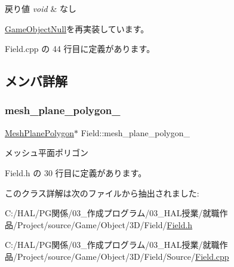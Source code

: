 \begin{DoxyRetVals}{戻り値}
{\em void} & なし \\
\hline
\end{DoxyRetVals}


\mbox{\hyperlink{class_game_object_null_a1a70fbd3260fd1c0100320756830a0db}{Game\+Object\+Null}}を再実装しています。



 Field.\+cpp の 44 行目に定義があります。



\subsection{メンバ詳解}
\mbox{\label{class_field_a5c4ad4d2fea2269e7ab2185cf09beb10}} 
\subsubsection{\texorpdfstring{mesh\+\_\+plane\+\_\+polygon\+\_\+}{mesh\_plane\_polygon\_}}
{\footnotesize\ttfamily \mbox{\hyperlink{class_mesh_plane_polygon}{Mesh\+Plane\+Polygon}}$\ast$ Field\+::mesh\+\_\+plane\+\_\+polygon\+\_\+\hspace{0.3cm}{\ttfamily [private]}}



メッシュ平面ポリゴン 



 Field.\+h の 30 行目に定義があります。



このクラス詳解は次のファイルから抽出されました\+:\begin{DoxyCompactItemize}
\item 
C\+:/\+H\+A\+L/\+P\+G関係/03\+\_\+作成プログラム/03\+\_\+\+H\+A\+L授業/就職作品/\+Project/source/\+Game/\+Object/3\+D/\+Field/\mbox{\hyperlink{_field_8h}{Field.\+h}}\item 
C\+:/\+H\+A\+L/\+P\+G関係/03\+\_\+作成プログラム/03\+\_\+\+H\+A\+L授業/就職作品/\+Project/source/\+Game/\+Object/3\+D/\+Field/\+Source/\mbox{\hyperlink{_field_8cpp}{Field.\+cpp}}\end{DoxyCompactItemize}

